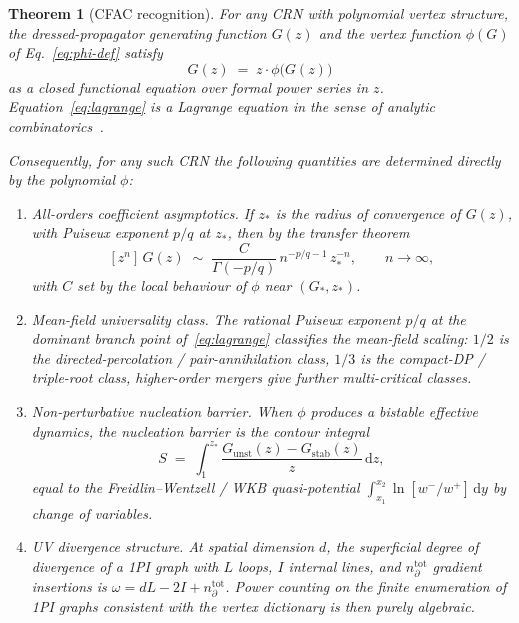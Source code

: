 \documentclass[11pt,a4paper]{article}
\newcommand{\dd}{\mathrm{d}}
\theoremstyle{plain}
\newtheorem{theorem}{Theorem}
\theoremstyle{definition}
\begin{document}
\begin{theorem}[CFAC recognition]
\label{thm:cfac}
For any CRN with polynomial vertex structure, the
dressed-propagator generating function $G(z)$ and the vertex
function $\phi(G)$ of Eq.~\eqref{eq:phi-def} satisfy
\begin{equation}\label{eq:lagrange}
  \boxed{\;G(z) \;=\; z \cdot \phi\bigl(G(z)\bigr)\;}
\end{equation}
as a closed functional equation over formal power series in $z$.
Equation~\eqref{eq:lagrange} is a \emph{Lagrange equation} in the
sense of analytic combinatorics~\citep{FlajoletSedgewick}.

Consequently, for any such CRN the following quantities are
determined directly by the polynomial $\phi$:
\begin{enumerate}[leftmargin=1.8em, itemsep=-0.1em, label=(C\arabic*)]
\item \emph{All-orders coefficient asymptotics.}
  If $z_*$ is the radius of convergence of $G(z)$, with
  Puiseux exponent $p/q$ at $z_*$, then by the transfer theorem
\begin{equation}\label{eq:transfer}
  [z^n]\,G(z)
  \;\sim\;
  \frac{C}{\Gamma(-p/q)}\,n^{-p/q - 1}\,z_*^{-n},
  \qquad n \to \infty,
\end{equation}
  with $C$ set by the local behaviour of $\phi$ near
  $(G_*, z_*)$.
\item \emph{Mean-field universality class.}
  The rational Puiseux exponent $p/q$ at the dominant branch
  point of~\eqref{eq:lagrange} classifies the mean-field scaling:
  $1/2$ is the directed-percolation / pair-annihilation class,
  $1/3$ is the compact-DP / triple-root class, higher-order
  mergers give further multi-critical classes.
\item \emph{Non-perturbative nucleation barrier.}
  When $\phi$ produces a bistable effective dynamics, the
  nucleation barrier is the contour integral
\begin{equation}\label{eq:branchgap}
  S \;=\; \int_1^{z_*}
    \frac{G_{\mathrm{unst}}(z) - G_{\mathrm{stab}}(z)}{z}\,\dd z,
\end{equation}
  equal to the Freidlin--Wentzell / WKB quasi-potential
  $\int_{x_1}^{x_2}\ln[w^-/w^+]\,\dd y$ by change of variables.
\item \emph{UV divergence structure.}
  At spatial dimension $d$, the superficial degree of divergence
  of a 1PI graph with $L$ loops, $I$ internal lines, and
  $n_\partial^{\mathrm{tot}}$ gradient insertions is
  $\omega = dL - 2I + n_\partial^{\mathrm{tot}}$.  Power counting
  on the finite enumeration of 1PI graphs consistent with the
  vertex dictionary is then purely algebraic.
\end{enumerate}
\end{theorem}
\end{document}
